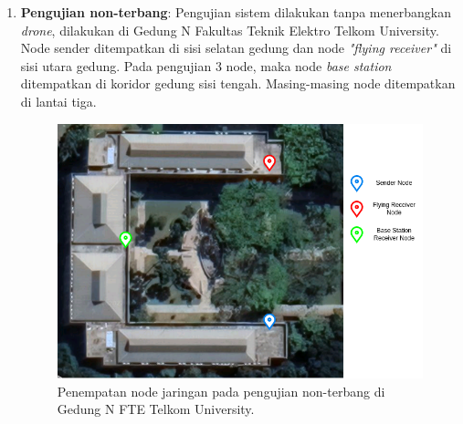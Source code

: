 \begin{enumerate}
	\item \textbf{Pengujian non-terbang}: Pengujian sistem dilakukan tanpa menerbangkan \textit{drone}, dilakukan di Gedung N Fakultas Teknik Elektro Telkom University. Node sender ditempatkan di sisi selatan gedung dan node \textit{"flying receiver"} di sisi utara gedung. Pada pengujian 3 node, maka node \textit{base station} ditempatkan di koridor gedung sisi tengah. Masing-masing node ditempatkan di lantai tiga.
	\begin{figure}[H]
		\centering
		\includegraphics[scale=0.5]{./assets/PetaNonTerbangN}
		\caption{Penempatan node jaringan pada pengujian non-terbang di Gedung N FTE Telkom University.}
	\end{figure}


\end{enumerate}
